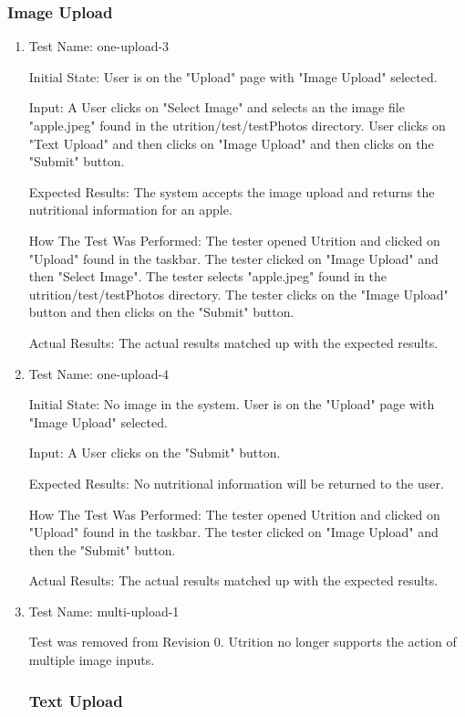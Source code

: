 \documentclass[12pt, titlepage]{article}
\begin{document}
	\subsubsection{Image Upload}
	\begin{enumerate}
		\item{Test Name: one-upload-3}
		
		Initial State: User is on the "Upload" page with "Image Upload" selected.
		
		Input: A User clicks on "Select Image" and selects an the image file "apple.jpeg" found in the utrition/test/testPhotos directory. User clicks on "Text Upload" and then clicks on "Image Upload" and then clicks on the "Submit" button.
		
		Expected Results: The system accepts the image upload and returns the nutritional information for an apple. 
		
		How The Test Was Performed: The tester opened Utrition and clicked on "Upload" found in the taskbar. The tester clicked on "Image Upload" and then "Select Image". The tester selects "apple.jpeg" found in the utrition/test/testPhotos directory. The tester clicks on the "Image Upload" button and then clicks on the "Submit" button.
		
		Actual Results: The actual results matched up with the expected results. 
		
		\item{Test Name: one-upload-4}
		
		Initial State: No image in the system. User is on the "Upload" page with "Image Upload" selected.
		
		Input: A User clicks on the "Submit" button.
		
		Expected Results: No nutritional information will be returned to the user.
		
		How The Test Was Performed: The tester opened Utrition and clicked on "Upload" found in the taskbar. The tester clicked on "Image Upload" and then the "Submit" button.
		
		Actual Results: The actual results matched up with the expected results.
		
		\item{Test Name: multi-upload-1}
		
		Test was removed from Revision 0. Utrition no longer supports the action of multiple image inputs.
		
		\subsubsection{Text Upload}
		

\end{enumerate}
\end{document}

